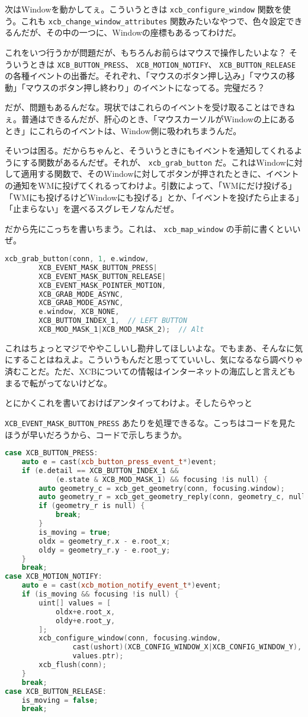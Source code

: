 \documentclass[12pt,a4paper]{jsarticle}
\begin{document}
次はWindowを動かしてぇ。こういうときは \lstinline{xcb_configure_window} 関数を使う。これも \lstinline{xcb_change_window_attributes} 関数みたいなやつで、色々設定できるんだが、その中の一つに、Windowの座標もあるってわけだ。

これをいつ行うかが問題だが、もちろんお前らはマウスで操作したいよな？ そういうときは \lstinline{XCB_BUTTON_PRESS}、 \lstinline{XCB_MOTION_NOTIFY}、 \lstinline{XCB_BUTTON_RELEASE}の各種イベントの出番だ。それぞれ、「マウスのボタン押し込み」「マウスの移動」「マウスのボタン押し終わり」のイベントになってる。完璧だろ？

だが、問題もあるんだな。現状ではこれらのイベントを受け取ることはできねぇ。普通はできるんだが、肝心のとき、「マウスカーソルがWindowの上にあるとき」にこれらのイベントは、Window側に吸われちまうんだ。

そいつは困る。だからちゃんと、そういうときにもイベントを通知してくれるようにする関数があるんだぜ。それが、 \lstinline{xcb_grab_button} だ。これはWindowに対して適用する関数で、そのWindowに対してボタンが押されたときに、イベントの通知をWMに投げてくれるってわけよ。引数によって、「WMにだけ投げる」「WMにも投げるけどWindowにも投げる」とか、「イベントを投げたら止まる」「止まらない」を選べるスグレモノなんだぜ。

だから先にこっちを書いちまう。これは、 \lstinline{xcb_map_window} の手前に書くといいぜ。

\begin{lstlisting}[language=C++]
xcb_grab_button(conn, 1, e.window,
		XCB_EVENT_MASK_BUTTON_PRESS|
		XCB_EVENT_MASK_BUTTON_RELEASE|
		XCB_EVENT_MASK_POINTER_MOTION,
		XCB_GRAB_MODE_ASYNC,
		XCB_GRAB_MODE_ASYNC,
		e.window, XCB_NONE,
		XCB_BUTTON_INDEX_1,  // LEFT BUTTON
		XCB_MOD_MASK_1|XCB_MOD_MASK_2);  // Alt
\end{lstlisting}

これはちょっとマジでややこしいし勘弁してほしいよな。でもまあ、そんなに気にすることはねえよ。こういうもんだと思ってていいし、気になるなら調べりゃ済むことだ。ただ、XCBについての情報はインターネットの海広しと言えどもまるで転がってないけどな。

とにかくこれを書いておけばアンタイってわけよ。そしたらやっと \raggedright\lstinline{XCB_EVENT_MASK_BUTTON_PRESS} あたりを処理できるな。こっちはコードを見たほうが早いだろうから、コードで示しちまうか。

\begin{lstlisting}[language=C++]
case XCB_BUTTON_PRESS:
	auto e = cast(xcb_button_press_event_t*)event;
	if (e.detail == XCB_BUTTON_INDEX_1 &&
			(e.state & XCB_MOD_MASK_1) && focusing !is null) {
		auto geometry_c = xcb_get_geometry(conn, focusing.window);
		auto geometry_r = xcb_get_geometry_reply(conn, geometry_c, null);
		if (geometry_r is null) {
			break;
		}
		is_moving = true;
		oldx = geometry_r.x - e.root_x;
		oldy = geometry_r.y - e.root_y;
	}
	break;
case XCB_MOTION_NOTIFY:
	auto e = cast(xcb_motion_notify_event_t*)event;
	if (is_moving && focusing !is null) {
		uint[] values = [
			oldx+e.root_x,
			oldy+e.root_y,
		];
		xcb_configure_window(conn, focusing.window,
				cast(ushort)(XCB_CONFIG_WINDOW_X|XCB_CONFIG_WINDOW_Y),
				values.ptr);
		xcb_flush(conn);
	}
	break;
case XCB_BUTTON_RELEASE:
	is_moving = false;
	break;
\end{lstlisting}
\end{document}
